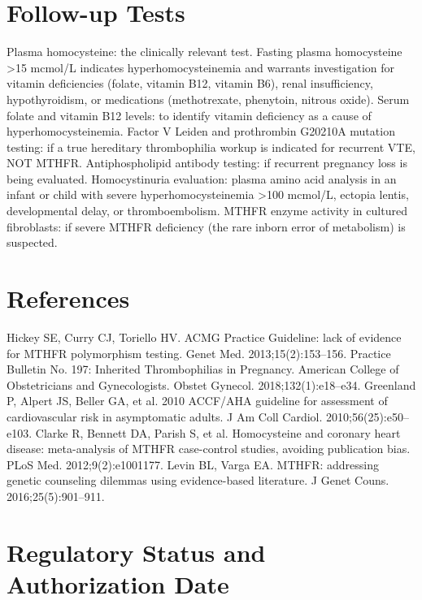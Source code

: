 \section*{Follow-up Tests}
Plasma homocysteine: the clinically relevant test. Fasting plasma homocysteine >15 mcmol/L indicates hyperhomocysteinemia and warrants investigation for vitamin deficiencies (folate, vitamin B12, vitamin B6), renal insufficiency, hypothyroidism, or medications (methotrexate, phenytoin, nitrous oxide). Serum folate and vitamin B12 levels: to identify vitamin deficiency as a cause of hyperhomocysteinemia. Factor V Leiden and prothrombin G20210A mutation testing: if a true hereditary thrombophilia workup is indicated for recurrent VTE, NOT MTHFR. Antiphospholipid antibody testing: if recurrent pregnancy loss is being evaluated. Homocystinuria evaluation: plasma amino acid analysis in an infant or child with severe hyperhomocysteinemia >100 mcmol/L, ectopia lentis, developmental delay, or thromboembolism. MTHFR enzyme activity in cultured fibroblasts: if severe MTHFR deficiency (the rare inborn error of metabolism) is suspected.

\section*{References}
Hickey SE, Curry CJ, Toriello HV. ACMG Practice Guideline: lack of evidence for MTHFR polymorphism testing. Genet Med. 2013;15(2):153--156. Practice Bulletin No. 197: Inherited Thrombophilias in Pregnancy. American College of Obstetricians and Gynecologists. Obstet Gynecol. 2018;132(1):e18--e34. Greenland P, Alpert JS, Beller GA, et al. 2010 ACCF/AHA guideline for assessment of cardiovascular risk in asymptomatic adults. J Am Coll Cardiol. 2010;56(25):e50--e103. Clarke R, Bennett DA, Parish S, et al. Homocysteine and coronary heart disease: meta-analysis of MTHFR case-control studies, avoiding publication bias. PLoS Med. 2012;9(2):e1001177. Levin BL, Varga EA. MTHFR: addressing genetic counseling dilemmas using evidence-based literature. J Genet Couns. 2016;25(5):901--911.

\clearpage
\section*{Regulatory Status and Authorization Date}

\clearpage
